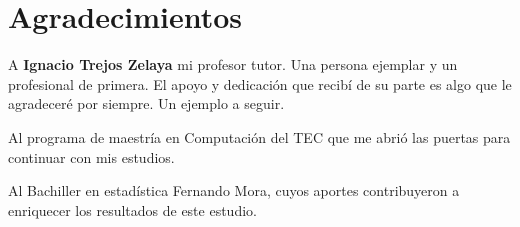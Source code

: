 \section*{Agradecimientos}
A \textbf{Ignacio Trejos Zelaya} mi profesor tutor. Una persona ejemplar y un profesional de primera. El apoyo y dedicación que recibí de su parte es algo que le agradeceré por siempre. Un ejemplo a seguir.


Al programa de maestría en Computación del TEC que me abrió las puertas para continuar con mis estudios.

Al Bachiller en estadística Fernando Mora, cuyos aportes contribuyeron a enriquecer los resultados de este estudio.


\newpage